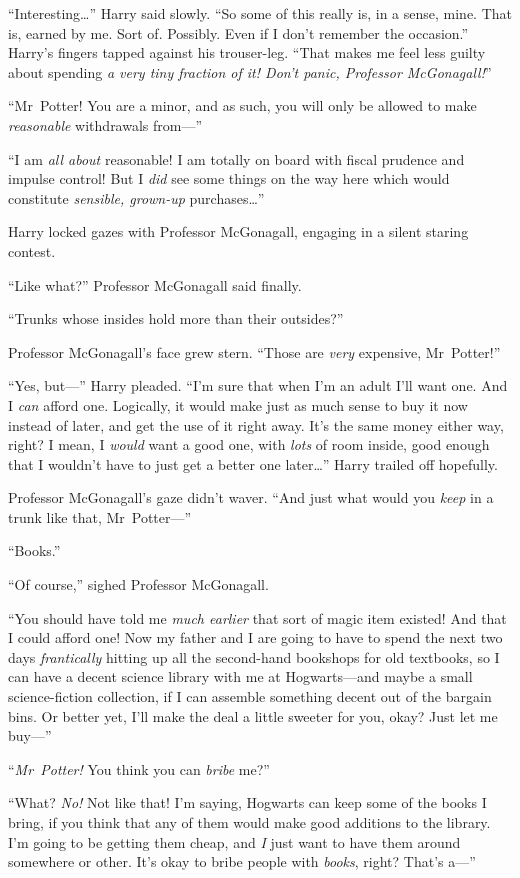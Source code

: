 “Interesting…” Harry said slowly.
“So some of this really is, in a sense, mine. That is, earned by me. Sort of. Possibly. Even if I don’t remember the occasion.” Harry’s fingers tapped against his trouser-leg.
“That makes me feel less guilty about spending \emph{a very tiny fraction of it! Don’t panic, Professor McGonagall!}”

“Mr~Potter! You are a minor, and as such, you will only be allowed to make \emph{reasonable} withdrawals from—”

“I am \emph{all about} reasonable! I am totally on board with fiscal prudence and impulse control! But I \emph{did} see some things on the way here which would constitute \emph{sensible, grown-up} purchases…”

Harry locked gazes with Professor McGonagall, engaging in a silent staring contest.

“Like what?” Professor McGonagall said finally.

“Trunks whose insides hold more than their outsides?”

Professor McGonagall’s face grew stern.
“Those are \emph{very} expensive, Mr~Potter!”

“Yes, but—” Harry pleaded.
“I’m sure that when I’m an adult I’ll want one. And I \emph{can} afford one. Logically, it would make just as much sense to buy it now instead of later, and get the use of it right away. It’s the same money either way, right? I mean, I \emph{would} want a good one, with \emph{lots} of room inside, good enough that I wouldn’t have to just get a better one later…” Harry trailed off hopefully.

Professor McGonagall’s gaze didn’t waver.
“And just what would you \emph{keep} in a trunk like that, Mr~Potter—”

“Books.”

“Of course,” sighed Professor McGonagall.

“You should have told me \emph{much earlier} that sort of magic item existed! And that I could afford one! Now my father and I are going to have to spend the next two days \emph{frantically} hitting up all the second-hand bookshops for old textbooks, so I can have a decent science library with me at Hogwarts—and maybe a small science-fiction collection, if I can assemble something decent out of the bargain bins. Or better yet, I’ll make the deal a little sweeter for you, okay? Just let me buy—”

“\emph{Mr~Potter!} You think you can \emph{bribe} me?”

“What? \emph{No!} Not like that! I’m saying, Hogwarts can keep some of the books I bring, if you think that any of them would make good additions to the library. I’m going to be getting them cheap, and \emph{I} just want to have them around somewhere or other. It’s okay to bribe people with \emph{books}, right? That’s a—”

